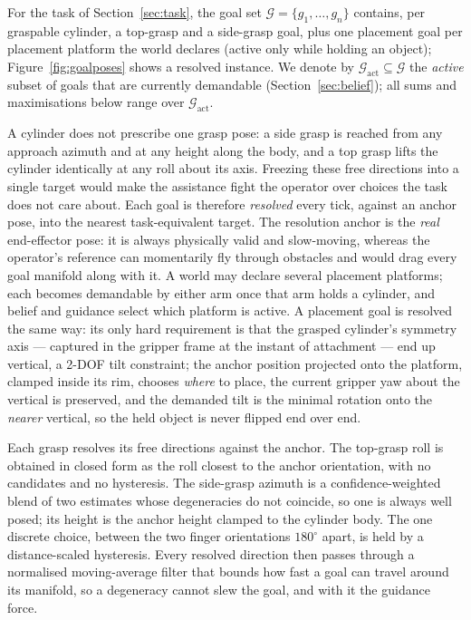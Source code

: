 \documentclass[12pt,a4paper,twoside,openright]{report}
\begin{document}
For the task of Section~\ref{sec:task}, the goal set $\mathcal{G} = \{g_1,\dots,g_n\}$ contains, per graspable cylinder, a top-grasp and a side-grasp goal, plus one placement goal per placement platform the world declares (active only while holding an object); Figure~\ref{fig:goalposes} shows a resolved instance. We denote by $\mathcal{G}_{\text{act}} \subseteq \mathcal{G}$ the \emph{active} subset of goals that are currently demandable (Section~\ref{sec:belief}); all sums and maximisations below range over $\mathcal{G}_{\text{act}}$.

A cylinder does not prescribe one grasp pose: a side grasp is reached from any approach azimuth and at any height along the body, and a top grasp lifts the cylinder identically at any roll about its axis. Freezing these free directions into a single target would make the assistance fight the operator over choices the task does not care about. Each goal is therefore \emph{resolved} every tick, against an anchor pose, into the nearest task-equivalent target. The resolution anchor is the \emph{real} end-effector pose: it is always physically valid and slow-moving, whereas the operator's reference can momentarily fly through obstacles and would drag every goal manifold along with it. A world may declare several placement platforms; each becomes demandable by either arm once that arm holds a cylinder, and belief and guidance select which platform is active. A placement goal is resolved the same way: its only hard requirement is that the grasped cylinder's symmetry axis --- captured in the gripper frame at the instant of attachment --- end up vertical, a 2-DOF tilt constraint; the anchor position projected onto the platform, clamped inside its rim, chooses \emph{where} to place, the current gripper yaw about the vertical is preserved, and the demanded tilt is the minimal rotation onto the \emph{nearer} vertical, so the held object is never flipped end over end.

Each grasp resolves its free directions against the anchor. The top-grasp roll is obtained in closed form as the roll closest to the anchor orientation, with no candidates and no hysteresis. The side-grasp azimuth is a confidence-weighted blend of two estimates whose degeneracies do not coincide, so one is always well posed; its height is the anchor height clamped to the cylinder body. The one discrete choice, between the two finger orientations $180^{\circ}$ apart, is held by a distance-scaled hysteresis. Every resolved direction then passes through a normalised moving-average filter that bounds how fast a goal can travel around its manifold, so a degeneracy cannot slew the goal, and with it the guidance force.
\end{document}
